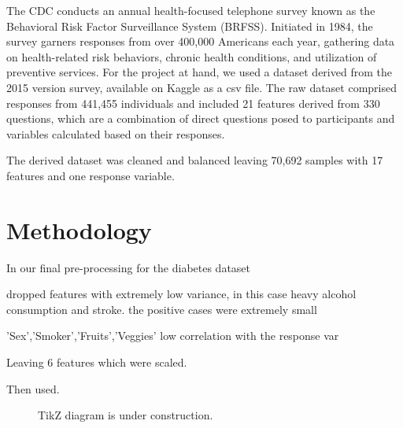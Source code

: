 \documentclass[journal]{IEEEtran}
\begin{document}
	The CDC conducts an annual health-focused telephone survey known as the Behavioral Risk Factor Surveillance System (BRFSS). Initiated in 1984, the survey garners responses from over 400,000 Americans each year, gathering data on health-related risk behaviors, chronic health conditions, and utilization of preventive services. For the project at hand, we used a dataset derived from the 2015 version survey, available on Kaggle as a csv file. The raw dataset comprised responses from 441,455 individuals and included 21 features derived from 330 questions, which are a combination of direct questions posed to participants and variables calculated based on their responses.

	The derived dataset was cleaned and balanced leaving 70,692 samples with 17 features and one response variable. 
	
	
	\section{Methodology}
	\label{sec:methodology}




In our final pre-processing for the diabetes dataset

dropped features with extremely low variance,
in this case heavy alcohol consumption and stroke.
the positive cases were extremely small

'Sex','Smoker','Fruits','Veggies'
low correlation with the response var

Leaving 6 features
which were scaled.

Then used.



\begin{figure}
	\centering
	\caption{TikZ diagram is under construction.}
	\label{fig:4lrff}
\end{figure}
\end{document}
